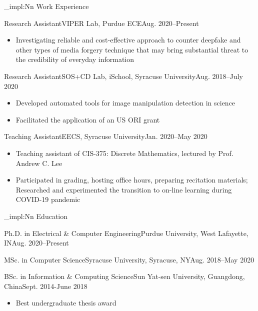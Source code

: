 \documentclass[10pt]{article}
\newcommand{\cvhead}[1]{\cvhead_impl:Nn \Large {#1}}
\begin{document}
{
\color{c-text-primary}
\begin{minipage}[t]{0.48\linewidth}
\cvhead{Work Experience}
\begin{triplehead}{Research Assistant}{VIPER Lab, Purdue ECE}{Aug. 2020--Present}
\begin{itemize}
\item Investigating reliable and cost-effective approach to counter deepfake and other types of media forgery technique that may bring substantial threat to the credibility of everyday information
\end{itemize}
\end{triplehead}

\begin{triplehead}{Research Assistant}{SOS+CD Lab, iSchool, Syracuse University}{Aug. 2018--July 2020}
\begin{itemize}
\item Developed automated tools for image manipulation detection in science
\item Facilitated the application of an US ORI grant
\end{itemize}
\end{triplehead}

\begin{triplehead}{Teaching Assistant}{EECS, Syracuse University}{Jan. 2020--May 2020}
\begin{itemize}
\item Teaching assistant of CIS-375: Discrete Mathematics, lectured by Prof. Andrew C. Lee
\item Participated in grading, hosting office hours, preparing recitation materials; Researched and experimented the transition to on-line learning during COVID-19 pandemic
\end{itemize}
\end{triplehead}


\cvhead{Education}

\begin{triplehead}{Ph.D. in Electrical \& Computer Engineering}{Purdue University, West Lafayette, IN}{Aug. 2020--Present}
\end{triplehead}

\begin{triplehead}{MSc. in Computer Science}{Syracuse University, Syracuse, NY}{Aug. 2018--May 2020}
\end{triplehead}

\begin{triplehead}{BSc. in Information \& Computing Science}{Sun Yat-sen University, Guangdong, China}{Sept. 2014-June 2018}
\begin{itemize}
\item Best undergraduate thesis award
\end{itemize}
\end{triplehead}


\end{minipage}}
\end{document}
